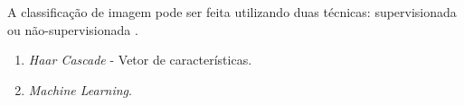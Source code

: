 A classificação de imagem pode ser feita utilizando duas técnicas: supervisionada ou não-supervisionada \cite{LIBERMAN97}.

\begin{enumerate}
    \item<1> \textit{Haar Cascade} - Vetor de características.
    \item<1> \textit{Machine Learning}.
\end{enumerate}